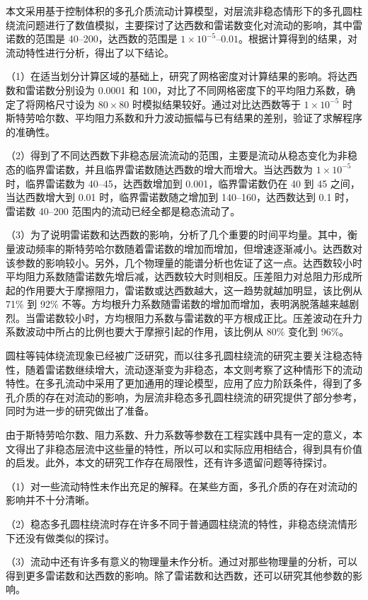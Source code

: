 \begin{conclusions}

本文采用基于控制体积的多孔介质流动计算模型，对层流非稳态情形下的多孔圆柱绕流问题进行了数值模拟，主要探讨了达西数和雷诺数变化对流动的影响，其中雷诺数的范围是 40--200，达西数的范围是 $1\times 10^{-5}$--$0.01$。根据计算得到的结果，对流动特性进行分析，得出了以下结论。

（1）在适当划分计算区域的基础上，研究了网格密度对计算结果的影响。将达西数和雷诺数分别设为 0.0001 和 100，对比了不同网格密度下的平均阻力系数，确定了将网格尺寸设为 $80\times 80$ 时模拟结果较好。通过对比达西数等于 $1\times 10^{-5}$ 时斯特劳哈尔数、平均阻力系数和升力波动振幅与已有结果的差别，验证了求解程序的准确性。

（2）得到了不同达西数下非稳态层流流动的范围，主要是流动从稳态变化为非稳态的临界雷诺数，并且临界雷诺数随达西数的增大而增大。当达西数为 $1\times 10^{-5}$ 时，临界雷诺数为 40--45，达西数增加到 0.001，临界雷诺数仍在 40 到 45 之间，当达西数增大到 0.01 时，临界雷诺数随之增加到 140--160，达西数达到 0.1 时，雷诺数 40--200 范围内的流动已经全都是稳态流动了。

（3）为了说明雷诺数和达西数的影响，分析了几个重要的时间平均量。其中，衡量波动频率的斯特劳哈尔数随着雷诺数的增加而增加，但增速逐渐减小。达西数对该参数的影响较小。另外，几个物理量的能谱分析也佐证了这一点。达西数较小时平均阻力系数随雷诺数先增后减，达西数较大时则相反。压差阻力对总阻力形成所起的作用要大于摩擦阻力，雷诺数或达西数越大，这一趋势就越加明显，该比例从 71\% 到 92\% 不等。方均根升力系数随雷诺数的增加而增加，表明涡脱落越来越剧烈。当雷诺数较小时，方均根阻力系数与雷诺数的平方根成正比。压差波动在升力系数波动中所占的比例也要大于摩擦引起的作用，该比例从 80\% 变化到 96\%。%

圆柱等钝体绕流现象已经被广泛研究，而以往多孔圆柱绕流的研究主要关注稳态特性，随着雷诺数继续增大，流动逐渐变为非稳态，本文则考察了这种情形下的流动特性。在多孔流动中采用了更加通用的理论模型，应用了应力阶跃条件，得到了多孔介质的存在对流动的影响，为层流非稳态多孔圆柱绕流的研究提供了部分参考，同时为进一步的研究做出了准备。

由于斯特劳哈尔数、阻力系数、升力系数等参数在工程实践中具有一定的意义，本文得出了非稳态层流中这些量的特性，所以可以和实际应用相结合，得到具有价值的启发。此外，本文的研究工作存在局限性，还有许多遗留问题等待探讨。

（1）对一些流动特性未作出充足的解释。在某些方面，多孔介质的存在对流动的影响并不十分清晰。

（2）稳态多孔圆柱绕流时存在许多不同于普通圆柱绕流的特性，非稳态绕流情形下还没有做类似的探讨。

（3）流动中还有许多有意义的物理量未作分析。通过对那些物理量的分析，可以得到更多雷诺数和达西数的影响。除了雷诺数和达西数，还可以研究其他参数的影响。

\end{conclusions}
